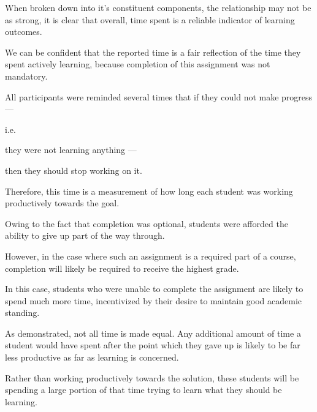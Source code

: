        When broken down into it's constituent components, the relationship may not be as strong, it is clear that overall, time spent is a reliable indicator of learning outcomes.







        We can be confident that the reported time is a fair reflection of the time they spent actively learning, because completion of this assignment was not mandatory. %



All participants were reminded several times that if they could not make progress ---%



 i.e. %



they were not learning anything ---%



 then they should stop working on it. %



Therefore, this time is a measurement of how long each student was working productively towards the goal. 







        Owing to the fact that completion was optional, students were afforded the ability to give up part of the way through. %



However, in the case where such an assignment is a required part of a course, completion will likely be required to receive the highest grade. %



In this case, students who were unable to complete the assignment are likely to spend much more time, incentivized by their desire to maintain good academic standing. %



As \citeauthor{Z-Zeng} demonstrated, not all time is made equal. Any additional amount of time a student would have spent after the point which they gave up is likely to be far less productive as far as learning is concerned. %



Rather than working productively towards the solution, these students will be spending a large portion of that time trying to learn what they should be learning.







